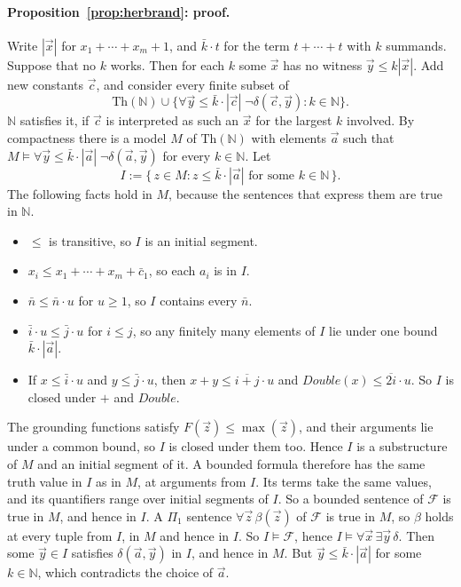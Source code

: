 \documentclass[11pt]{article}
\newcommand{\F}{\mathcal{F}}
\newcommand{\contra}{~\text{\Lightning}}  %
\theoremstyle{plain}
\theoremstyle{definition}
\begin{document}
\paragraph{Proposition~\ref{prop:herbrand}: proof.} Write $|\vec x|$ for
$x_1 + \cdots + x_m + 1$, and $\bar k \cdot t$ for the term $t + \cdots + t$
with $k$ summands. Suppose that no $k$ works. Then for each $k$ some $\vec x$
has no witness $\vec y \le k|\vec x|$. Add new constants $\vec c$, and
consider every finite subset of
\[
\mathrm{Th}(\mathbb N) \cup \{\forall \vec y \le \bar k \cdot |\vec c|\;
\neg\delta(\vec c, \vec y) : k \in \mathbb N\}.
\]
$\mathbb N$ satisfies it, if $\vec c$ is interpreted as such an $\vec x$ for
the largest $k$ involved. By compactness there is a model $M$ of
$\mathrm{Th}(\mathbb N)$ with elements $\vec a$ such that
$M \models \forall \vec y \le \bar k \cdot |\vec a|\; \neg\delta(\vec a,
\vec y)$ for every $k \in \mathbb N$. Let
\[
I := \{\, z \in M : z \le \bar k \cdot |\vec a| \text{ for some } k \in
\mathbb N \,\}.
\]
The following facts hold in $M$, because the sentences that express them are
true in $\mathbb N$.
\begin{itemize}[leftmargin=1.5em]
\item $\le$ is transitive, so $I$ is an initial segment.
\item $x_i \le x_1 + \cdots + x_m + \bar c_1$, so each $a_i$ is in $I$.
\item $\bar n \le \bar n \cdot u$ for $u \ge 1$, so $I$ contains every
  $\bar n$.
\item $\bar i \cdot u \le \bar j \cdot u$ for $i \le j$, so any finitely many
  elements of $I$ lie under one bound $\bar k \cdot |\vec a|$.
\item If $x \le \bar i \cdot u$ and $y \le \bar j \cdot u$, then
  $x + y \le \overline{i + j} \cdot u$ and
  $\mathit{Double}(x) \le \overline{2i} \cdot u$. So $I$ is closed under $+$
  and $\mathit{Double}$.
\end{itemize}
The grounding functions satisfy $F(\vec z) \le \max(\vec z)$, and their
arguments lie under a common bound, so $I$ is closed under them too. Hence
$I$ is a substructure of $M$ and an initial segment of it. A bounded formula
therefore has the same truth value in $I$ as in $M$, at arguments from $I$.
Its terms take the same values, and its quantifiers range over initial
segments of $I$. So a bounded sentence of $\F$ is true in $M$, and hence in
$I$. A $\Pi_1$ sentence $\forall \vec z\,\beta(\vec z)$ of $\F$ is true in
$M$, so $\beta$ holds at every tuple from $I$, in $M$ and hence in $I$. So
$I \models \F$, hence $I \models \forall\vec x\,\exists\vec y\,\delta$. Then
some $\vec y \in I$ satisfies $\delta(\vec a, \vec y)$ in $I$, and hence in
$M$. But $\vec y \le \bar k \cdot |\vec a|$ for some $k \in \mathbb N$, which
contradicts the choice of $\vec a$.\contra
\end{document}
